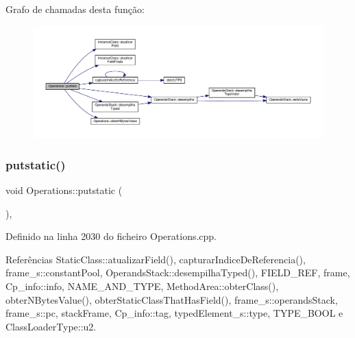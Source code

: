 Grafo de chamadas desta função\+:\nopagebreak
\begin{figure}[H]
\begin{center}
\leavevmode
\includegraphics[width=350pt]{classOperations_a56385f246d3d4d5c5674c988a1f0e658_cgraph}
\end{center}
\end{figure}
\mbox{\label{classOperations_ac6791ccfd8adf30d8f80b1f679f0b146}} 
\subsubsection{\texorpdfstring{putstatic()}{putstatic()}}
{\footnotesize\ttfamily void Operations\+::putstatic (\begin{DoxyParamCaption}{ }\end{DoxyParamCaption})\hspace{0.3cm}{\ttfamily [static]}, {\ttfamily [private]}}



Definido na linha 2030 do ficheiro Operations.\+cpp.



Referências Static\+Class\+::atualizar\+Field(), capturar\+Indice\+De\+Referencia(), frame\+\_\+s\+::constant\+Pool, Operands\+Stack\+::desempilha\+Typed(), F\+I\+E\+L\+D\+\_\+\+R\+EF, frame, Cp\+\_\+info\+::info, N\+A\+M\+E\+\_\+\+A\+N\+D\+\_\+\+T\+Y\+PE, Method\+Area\+::obter\+Class(), obter\+N\+Bytes\+Value(), obter\+Static\+Class\+That\+Has\+Field(), frame\+\_\+s\+::operands\+Stack, frame\+\_\+s\+::pc, stack\+Frame, Cp\+\_\+info\+::tag, typed\+Element\+\_\+s\+::type, T\+Y\+P\+E\+\_\+\+B\+O\+OL e Class\+Loader\+Type\+::u2.

